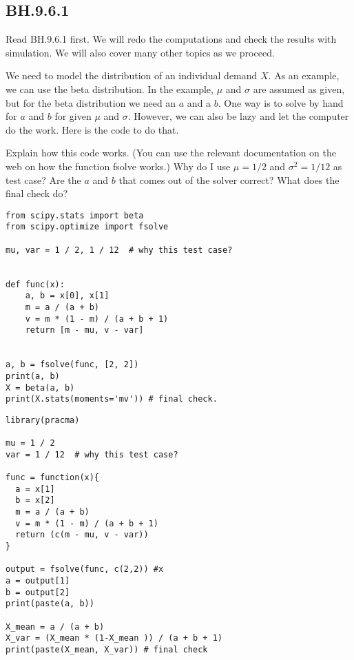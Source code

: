 
\subsection{BH.9.6.1}
\label{sec:bh.9.6.1}

Read BH.9.6.1 first. We will redo the computations and check the results with simulation. We will also cover many other topics as we proceed.



\begin{exercise}
We need to model the distribution of an individual demand $X$.
As an example, we can use the beta distribution. In the example, $\mu$ and $\sigma$ are assumed as given, but for the beta distribution we need an $a$ and a $b$. One way is to solve by hand for $a$ and $b$ for given $\mu$ and $\sigma$. However, we can also be lazy and let the computer do the work. Here is the code to do that.

Explain how this code works. (You can use the relevant documentation on the web on how the function fsolve works.) Why do I use $\mu=1/2$ and $\sigma^{2}=1/12$ as test case? Are the $a$ and $b$ that comes out of the solver correct? What does the final check do?
\begin{verbatim}
from scipy.stats import beta
from scipy.optimize import fsolve

mu, var = 1 / 2, 1 / 12  # why this test case?


def func(x):
    a, b = x[0], x[1]
    m = a / (a + b)
    v = m * (1 - m) / (a + b + 1)
    return [m - mu, v - var]


a, b = fsolve(func, [2, 2])
print(a, b)
X = beta(a, b)
print(X.stats(moments='mv')) # final check.
\end{verbatim}

\begin{verbatim}
library(pracma)

mu = 1 / 2
var = 1 / 12  # why this test case?

func = function(x){
  a = x[1]
  b = x[2]
  m = a / (a + b)
  v = m * (1 - m) / (a + b + 1)
  return (c(m - mu, v - var))
}

output = fsolve(func, c(2,2)) #x
a = output[1]
b = output[2]
print(paste(a, b))

X_mean = a / (a + b)
X_var = (X_mean * (1-X_mean )) / (a + b + 1)
print(paste(X_mean, X_var)) # final check

\end{verbatim}

\end{exercise}

